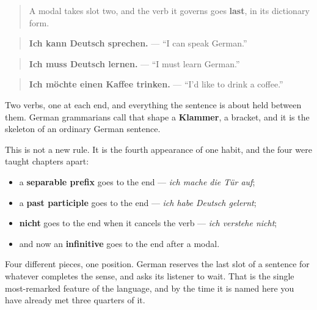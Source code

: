 \begin{grammarlens}[title={Grammar Lens: the modal holds slot two, the other verb waits at the end}]
\begin{quote}
A modal takes slot two, and the verb it governs goes \textbf{last}, in its dictionary form.
\end{quote}

\begin{quote}
\textbf{Ich kann Deutsch sprechen.} — \textquotedblleft{}I can speak German.\textquotedblright{}
\end{quote}

\begin{quote}
\textbf{Ich muss Deutsch lernen.} — \textquotedblleft{}I must learn German.\textquotedblright{}
\end{quote}

\begin{quote}
\textbf{Ich möchte einen Kaffee trinken.} — \textquotedblleft{}I'd like to drink a coffee.\textquotedblright{}
\end{quote}

Two verbs, one at each end, and everything the sentence is about held between them. German grammarians call that shape a \textbf{Klammer}, a bracket, and it is the skeleton of an ordinary German sentence.
\end{grammarlens}

\begin{culture}
This is not a new rule. It is the fourth appearance of one habit, and the four were taught chapters apart:

\begin{itemize}
\raggedright
  \item a \textbf{separable prefix} goes to the end — \emph{ich mache die Tür auf};
  \item a \textbf{past participle} goes to the end — \emph{ich habe Deutsch gelernt};
  \item \textbf{nicht} goes to the end when it cancels the verb — \emph{ich verstehe nicht};
  \item and now an \textbf{infinitive} goes to the end after a modal.
\end{itemize}

Four different pieces, one position. German reserves the last slot of a sentence for whatever completes the sense, and asks its listener to wait. That is the single most-remarked feature of the language, and by the time it is named here you have already met three quarters of it.
\end{culture}

